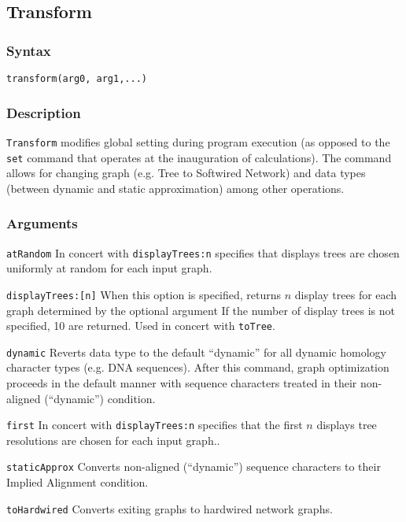 \documentclass[11pt]{article}
\begin{document}
	
	\subsection{Transform}
		\subsubsection{Syntax}
			\texttt{transform(arg0, arg1,...)}
			
		\subsubsection{Description}
			\texttt{Transform} modifies global setting during program execution (as opposed to the \texttt{set} command that operates at the inauguration of calculations).  The
			command allows for changing graph (e.g. Tree to Softwired Network) and data types (between dynamic and static approximation) among other operations.
			
		\subsubsection{Arguments}
			\noindent \texttt{atRandom} In concert with \texttt{displayTrees:n} specifies that displays trees are chosen uniformly at random for each input graph.
			
			\noindent \texttt{displayTrees:[n]} When this option is specified, returns $n$ display trees for each graph determined by the optional argument  If the number of display trees is not 
			specified, 10 are returned.  Used in concert with \texttt{toTree}.
			
			\smallskip		
			\noindent \texttt{dynamic} Reverts data type to the default ``dynamic'' for all dynamic homology \citep{Wheeler2001} character types (e.g. DNA sequences).  After this command, 
			graph optimization proceeds in the default manner with sequence characters treated in their non-aligned (``dynamic'') condition.
			
			\smallskip		
			\noindent \texttt{first}  In concert with \texttt{displayTrees:n} specifies that the first $n$ displays tree resolutions are chosen for each input graph..
			
			\smallskip		
			\noindent \texttt{staticApprox} Converts non-aligned (``dynamic'') sequence characters to their Implied Alignment \citep{Wheeler2003, WashburnandWheeler2020} condition.
			
			\smallskip		
			\noindent \texttt{toHardwired} Converts exiting graphs to hardwired network graphs.
			
\end{document}
